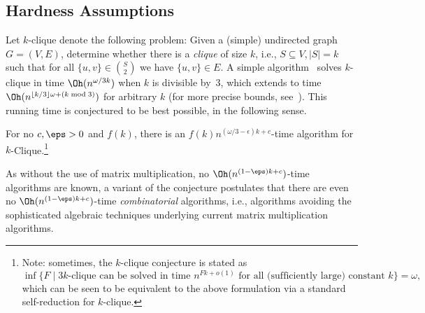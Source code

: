 \subsection{Hardness Assumptions}
%
Let $k$-clique denote the following problem: Given a (simple) undirected graph $G=(V,E)$, determine whether there is a \emph{clique} of size $k$, i.e., $S\subseteq V, |S|=k$ such that for all $\{u,v\} \in {S \choose 2}$ we have $\{u,v\} \in E$. A simple algorithm~\cite{NesetrilP85} solves $k$-clique in time $\Oh(n^{\omega/3 k})$ when $k$ is divisible by~$3$, which extends to time $\Oh(n^{\lfloor k/3\rfloor \omega + (k\bmod 3)})$ for arbitrary $k$ (for more precise bounds, see~\cite{EisenbrandG04}).
\label{sec:hardnessassumptions}
This running time is conjectured to be best possible, in the following sense.
%
\begin{hypo}
For no $c,\eps > 0$ and $f(k)$, there is an $f(k)n^{(\omega/3 - \epsilon)k+c}$-time algorithm for $k$-Clique.\footnote{Note: sometimes, the $k$-clique conjecture is stated as \[\inf \{ F \mid \text{$3k$-clique can be solved in time $n^{Fk+o(1)}$ for all (sufficiently large) constant $k$}\} = \omega,\] which can be seen to be equivalent to the above formulation via a standard self-reduction for $k$-clique.}
\end{hypo}
As without the use of matrix multiplication, no $\Oh(n^{(1-\eps)k+c})$-time algorithms are known, a variant of the conjecture postulates that there are even no $\Oh(n^{(1-\eps)k+c})$-time \emph{combinatorial} algorithms, i.e., algorithms avoiding the sophisticated algebraic techniques underlying current matrix multiplication algorithms. 
  
